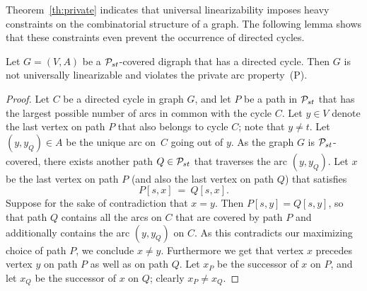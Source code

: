 \documentclass[runningheads]{llncs}
\begin{document}
Theorem~\ref{th:private} indicates that universal linearizability imposes heavy 
constraints on the combinatorial structure of a graph.
The following lemma shows that these constraints even prevent the occurrence of directed cycles.
\begin{lemma}
\label{le:no-cycle}
Let $G=(V,A)$ be a ${\cal P}_{st}$-covered digraph that has a directed cycle.
Then $G$ is not universally linearizable and violates the private arc property~(P).
\end{lemma}
\begin{proof}
Let $C$ be a directed cycle in graph $G$, and let $P$ be a path in ${\cal P}_{st}$ that has the 
largest possible number of arcs in common with the cycle $C$.
Let $y\in V$ denote the last vertex on path $P$ that also belongs to cycle $C$; note that $y\ne t$.
Let $(y,y_Q)\in A$ be the unique arc on~$C$ going out of $y$. 
As the graph $G$ is ${\cal P}_{st}$-covered, there exists another path $Q\in{\cal P}_{st}$ that traverses the arc $(y,y_Q)$.
Let $x$ be the last vertex on path $P$ (and also the last vertex on path $Q$) that satisfies
\begin{equation}
\label{eq:cyc.1}
P[s,x] ~=~ Q[s,x].
\end{equation}
Suppose for the sake of contradiction that $x=y$.
Then $P[s,y]=Q[s,y]$, so that path $Q$ contains all the arcs on $C$ that are covered by path $P$ 
and additionally contains the arc $(y,y_Q)$ on $C$.
As this contradicts our maximizing choice of path $P$, we conclude $x\ne y$.
Furthermore we get that vertex $x$ precedes vertex $y$ on path $P$ as well as on path $Q$.
Let $x_P$  be the successor of $x$ on $P$, and 
let $x_Q$  be the successor of $x$ on $Q$; clearly $x_P\ne x_Q$.


\end{proof}
\end{document}
